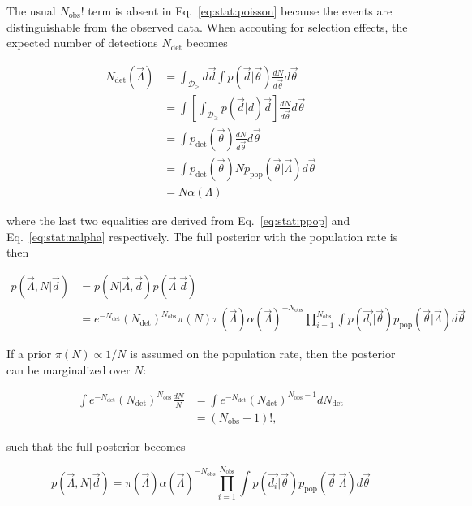 \documentclass[%
preprint,
nofootinbib,
 amsmath,amssymb,
 aps,
]{revtex4-2}
\newcommand{\given}[2]{p( #1 | #2 )}
\newcommand{\ppop}[0]{p_{\text{pop}}}
\newcommand{\pdet}[0]{p_{\text{det}}}
\newcommand{\ndet}[0]{N_{\text{det}}}
\newcommand{\nobs}[0]{N_{\text{obs}}}
\begin{document}
The usual $\nobs !$ term is absent in Eq.~\eqref{eq:stat:poisson} because the events are
distinguishable from the observed data. When accouting for selection effects, the expected number
of detections $\ndet$ becomes

\begin{align}
	\ndet(\vec{\Lambda}) & = \int_{\mathcal{D}_\geq}  d\vec{d} \int \given{\vec{d}}{\vec{\theta}} \frac{dN}{d\vec{\theta}} d\vec{\theta} \\
	                     & = \int \left[ \int_{\mathcal{D}_\geq} \given{\vec{d}} d\vec{d} \right]\frac{dN}{d\vec{\theta}} d\vec{\theta}  \\
	                     & = \int \pdet(\vec{\theta})\frac{dN}{d\vec{\theta}} d\vec{\theta}                                              \\
	                     & = \int \pdet(\vec{\theta}) N \ppop(\vec{\theta} | \vec{\Lambda}) d\vec{\theta}                                \\
	                     & = N \alpha(\Lambda)
\end{align}

where the last two equalities are derived from Eq.~\eqref{eq:stat:ppop} and
Eq.~\eqref{eq:stat:nalpha} respectively. The full posterior with the population rate is then

\begin{align}
	\nonumber
	\given{\vec{\Lambda}, N }{\vec{d}} & = \given{N}{\vec{\Lambda}, \vec{d}}\given{\vec{\Lambda}}{\vec{d}}                    \\
	                                   & = e^{-\ndet}(\ndet)^{\nobs} \pi(N) \pi(\vec{\Lambda}) \alpha(\vec{\Lambda})^{-\nobs}
	\prod_{i=1}^{\nobs} \int \given{\vec{d_i}}{\vec{\theta}} \ppop(\vec{\theta} | \vec{\Lambda} ) d\vec{\theta}
\end{align}

If a prior $\pi(N) \propto 1/N$ is assumed on the population rate, then the posterior can be
marginalized over $N$:

\begin{align}
	\int e^{-\ndet}(\ndet)^{\nobs} \frac{dN}{N} & = \int e^{-\ndet}(\ndet)^{\nobs - 1} d\ndet \\
	                                            & = (\nobs - 1)!,
\end{align}

such that the full posterior becomes

\begin{equation}
	\label{eq:stat:full-hierarchical-posterior}
	\given{\vec{\Lambda}, N }{\vec{d}} = \pi(\vec{\Lambda}) \alpha(\vec{\Lambda})^{-\nobs}
	\prod_{i=1}^{\nobs} \int \given{\vec{d_i}}{\vec{\theta}} \ppop(\vec{\theta} | \vec{\Lambda} ) d\vec{\theta}
\end{equation}
\end{document}

